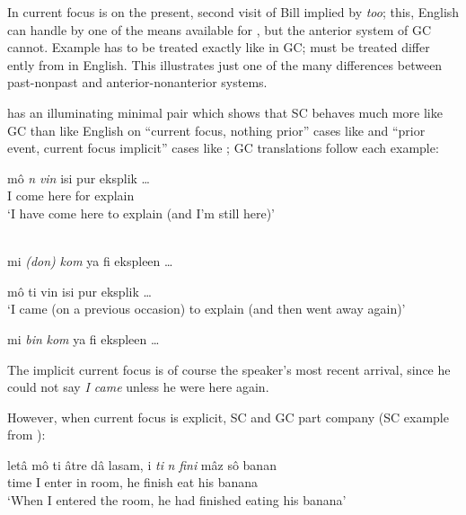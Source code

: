 In  current focus is on the present, second visit of Bill implied by \textit{too}; this, English can handle by one of the means available for , but the anterior system of GC cannot. Example  has to be treated exactly like  in GC;  must be treated differ%
ently from  in English. This illustrates just one of the many differences between past-nonpast and anterior-nonanterior systems.

\citet[107]{Corne1977} has an illuminating minimal pair which shows that SC behaves much more like GC than like English on ``current focus, nothing prior'' cases like  and ``prior event, current focus implicit'' cases like ; GC translations follow each example:

\ea\label{ex:2:106}
\gll mô \emph{n} \emph{vin} isi pur eksplik \ldots\\
I {\COMP} come here for explain\\
\glt `I have come here to explain (and I'm still here)'
\z

\ea\label{ex:2:107}
\ili{\langGC}{}{}\\
mi \textit{(don)} \textit{kom} ya fi ekspleen \ldots
\z

\ea\label{ex:2:108}
mô ti vin isi pur eksplik \ldots \\
\glt `I came (on a previous occasion) to explain (and then went away again)'
\z

\ea\label{ex:2:109}
 mi \textit{bin} \textit{kom} ya fi ekspleen \ldots
\glt
\z

\noindent The implicit current focus is of course the speaker's most recent arrival, since he could not say \textit{I came} unless he were here again.

However, when current focus is explicit, SC and GC part company (SC example from \citealt[108]{Corne1977}):

\ea\label{ex:2:110}
\gll letâ mô ti âtre dâ lasam, i \emph{ti} \emph{n} \emph{fini} mâz sô banan\footnotemark \\
time I {\TNS} enter in room, he {\TNS} {\COMP} finish eat his banana\\
\glt `When I entered the room, he had finished eating his banana'
\z
{}

